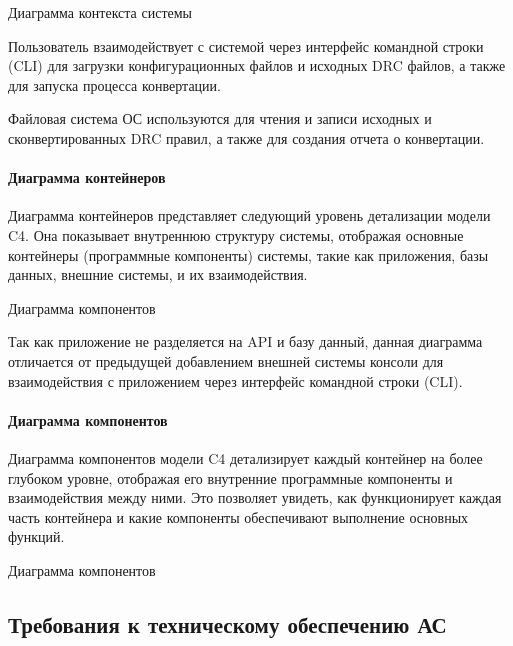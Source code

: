 \begin{image}
	\caption{Диаграмма контекста системы}
	\label{fig:c4:system:context}
\end{image}

Пользователь взаимодействует с системой через интерфейс командной строки (CLI)
для загрузки конфигурационных файлов и исходных DRC файлов,
а также для запуска процесса конвертации.\par
Файловая система ОС используются для чтения и записи исходных
и сконвертированных DRC правил, а также для создания отчета о конвертации.

\paragraph{Диаграмма контейнеров}

Диаграмма контейнеров представляет следующий уровень детализации модели C4.
Она показывает внутреннюю структуру системы,
отображая основные контейнеры (программные компоненты) системы,
такие как приложения, базы данных, внешние системы, и их взаимодействия.
   
\begin{image}
	\caption{Диаграмма компонентов}
	\label{fig:c4:container}
\end{image}

Так как приложение не разделяется на API и базу данный,
данная диаграмма отличается от предыдущей добавлением внешней системы
консоли для взаимодействия с приложением
через интерфейс командной строки (CLI).

\paragraph{Диаграмма компонентов}

Диаграмма компонентов модели C4 детализирует
каждый контейнер на более глубоком уровне,
отображая его внутренние программные компоненты и взаимодействия между ними.
Это позволяет увидеть, как функционирует каждая часть контейнера
и какие компоненты обеспечивают выполнение основных функций.

\begin{image}
	\caption{Диаграмма компонентов}
	\label{fig:c4:components}
\end{image}

\subsection{Требования к техническому обеспечению АС}

